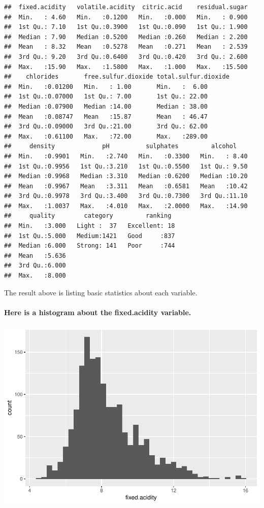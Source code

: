 \documentclass[]{article}
\let\oldparagraph\paragraph
\renewcommand{\paragraph}[1]{\oldparagraph{#1}\mbox{}}
\begin{document}
\begin{verbatim}
##  fixed.acidity   volatile.acidity  citric.acid    residual.sugar  
##  Min.   : 4.60   Min.   :0.1200   Min.   :0.000   Min.   : 0.900  
##  1st Qu.: 7.10   1st Qu.:0.3900   1st Qu.:0.090   1st Qu.: 1.900  
##  Median : 7.90   Median :0.5200   Median :0.260   Median : 2.200  
##  Mean   : 8.32   Mean   :0.5278   Mean   :0.271   Mean   : 2.539  
##  3rd Qu.: 9.20   3rd Qu.:0.6400   3rd Qu.:0.420   3rd Qu.: 2.600  
##  Max.   :15.90   Max.   :1.5800   Max.   :1.000   Max.   :15.500  
##    chlorides       free.sulfur.dioxide total.sulfur.dioxide
##  Min.   :0.01200   Min.   : 1.00       Min.   :  6.00      
##  1st Qu.:0.07000   1st Qu.: 7.00       1st Qu.: 22.00      
##  Median :0.07900   Median :14.00       Median : 38.00      
##  Mean   :0.08747   Mean   :15.87       Mean   : 46.47      
##  3rd Qu.:0.09000   3rd Qu.:21.00       3rd Qu.: 62.00      
##  Max.   :0.61100   Max.   :72.00       Max.   :289.00      
##     density             pH          sulphates         alcohol     
##  Min.   :0.9901   Min.   :2.740   Min.   :0.3300   Min.   : 8.40  
##  1st Qu.:0.9956   1st Qu.:3.210   1st Qu.:0.5500   1st Qu.: 9.50  
##  Median :0.9968   Median :3.310   Median :0.6200   Median :10.20  
##  Mean   :0.9967   Mean   :3.311   Mean   :0.6581   Mean   :10.42  
##  3rd Qu.:0.9978   3rd Qu.:3.400   3rd Qu.:0.7300   3rd Qu.:11.10  
##  Max.   :1.0037   Max.   :4.010   Max.   :2.0000   Max.   :14.90  
##     quality        category         ranking   
##  Min.   :3.000   Light :  37   Excellent: 18  
##  1st Qu.:5.000   Medium:1421   Good     :837  
##  Median :6.000   Strong: 141   Poor     :744  
##  Mean   :5.636                                
##  3rd Qu.:6.000                                
##  Max.   :8.000
\end{verbatim}

The result above is listing basic statistics about each variable.

\paragraph{Here is a histogram about the fixed.acidity
variable.}\label{here-is-a-histogram-about-the-fixed.acidity-variable.}

\includegraphics{RedWine_files/figure-latex/Make_Plot_Function_For_fixed.acidity-1.pdf}
\end{document}
